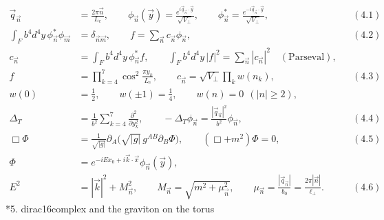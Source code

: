 \documentclass[10pt,a4paper]{article}
\makeatletter
\renewcommand\section{\@startsection{section}{1}{\z@}{-3.5ex \@plus -1ex \@minus -.2ex}{2.3ex \@plus.2ex}{\normalfont\Large\bfseries\raggedright}}
\makeatother
\begin{document}
\begin{align*}
\vec q_{\vec n}&=\frac{2\pi\vec n}{L_c},\qquad \phi_{\vec n}(\vec y)=\frac{e^{i\vec q_{\vec n}\cdot\vec y}}{\sqrt{V_\perp}},\qquad \phi^*_{\vec n}=\frac{e^{-i\vec q_{\vec n}\cdot\vec y}}{\sqrt{V_\perp}},&&(4.1) \\
\int_Fb^4d^4y\,\phi^*_{\vec n}\phi_{\vec m}&=\delta_{\vec n\vec m},\qquad f=\sum_{\vec n}c_{\vec n}\phi_{\vec n},&&(4.2) \\
c_{\vec n}&=\int_Fb^4d^4y\,\phi^*_{\vec n}f,\qquad \int_Fb^4d^4y\,|f|^2=\sum_{\vec n}|c_{\vec n}|^2\quad(\text{Parseval}), \\
f&=\prod_{k=4}^7\cos^2\frac{\pi y_k}{L_c},\qquad c_{\vec n}=\sqrt{V_\perp}\prod_kw(n_k),&&(4.3) \\
w(0)&=\tfrac12,\qquad w(\pm1)=\tfrac14,\qquad w(n)=0\ \ (|n|\ge2), \\
\Delta_T&=\frac1{b^2}\sum_{k=4}^7\frac{\partial^2}{\partial y_k^2},\qquad -\Delta_T\phi_{\vec n}=\frac{|\vec q_{\vec n}|^2}{b^2}\phi_{\vec n},&&(4.4) \\
\Box\Phi&=\frac1{\sqrt{|g|}}\partial_A\big(\sqrt{|g|}\,g^{AB}\partial_B\Phi\big),\qquad (\Box+m^2)\Phi=0,&&(4.5) \\
\Phi&=e^{-iEx_0+i\vec k\cdot\vec x}\phi_{\vec n}(\vec y), \\
E^2&=|\vec k|^2+M_{\vec n}^2,\qquad M_{\vec n}=\sqrt{m^2+\mu_{\vec n}^2},\qquad \mu_{\vec n}=\frac{|\vec q_{\vec n}|}{b_0}=\frac{2\pi|\vec n|}{\ell_\perp}.&&(4.6)
\end{align*}
\section*{5. dirac16complex and the graviton on the torus}
\end{document}
